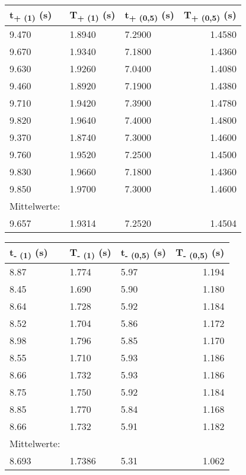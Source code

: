 \documentclass[titlepage=firstcover, captions=tableheading]{scrartcl}
\begin{document}
\begin{center}
    \begin{tabular}{lllr}
        \toprule
        t\textsubscript{+ (1)} (s) & T\textsubscript{+ (1)} (s) 
        & t\textsubscript{+ (0,5)} (s) & T\textsubscript{+ (0,5)} (s) \\
        \midrule
        9.470 & 1.8940 & 7.2900 & 1.4580 \\
        9.670 & 1.9340 & 7.1800 & 1.4360 \\
        9.630 & 1.9260 & 7.0400 & 1.4080 \\
        9.460 & 1.8920 & 7.1900 & 1.4380 \\
        9.710 & 1.9420 & 7.3900 & 1.4780 \\
        9.820 & 1.9640 & 7.4000 & 1.4800 \\
        9.370 & 1.8740 & 7.3000 & 1.4600 \\
        9.760 & 1.9520 & 7.2500 & 1.4500 \\
        9.830 & 1.9660 & 7.1800 & 1.4360 \\
        9.850 & 1.9700 & 7.3000 & 1.4600 \\
        \midrule
        Mittelwerte:\\
        9.657 & 1.9314 & 7.2520 & 1.4504\\
        
        \bottomrule
        
    \end{tabular}
\end{center}



\begin{center}
    \begin{tabular}{lllr}
        \toprule 
        t\textsubscript{- (1)} (s) & T\textsubscript{- (1)} (s) 
        & t\textsubscript{- (0,5)} (s) & T\textsubscript{- (0,5)} (s) \\
        \midrule
        8.87 & 1.774 & 5.97 & 1.194 \\
        8.45 & 1.690 & 5.90 & 1.180 \\
        8.64 & 1.728 & 5.92 & 1.184 \\
        8.52 & 1.704 & 5.86 & 1.172 \\
        8.98 & 1.796 & 5.85 & 1.170 \\
        8.55 & 1.710 & 5.93 & 1.186 \\
        8.66 & 1.732 & 5.93 & 1.186 \\
        8.75 & 1.750 & 5.92 & 1.184 \\
        8.85 & 1.770 & 5.84 & 1.168 \\
        8.66 & 1.732 & 5.91 & 1.182 \\
        \midrule
        Mittelwerte:\\
        8.693 & 1.7386 & 5.31 & 1.062\\
        
        \bottomrule
        
    \end{tabular}
\end{center}
\end{document}
